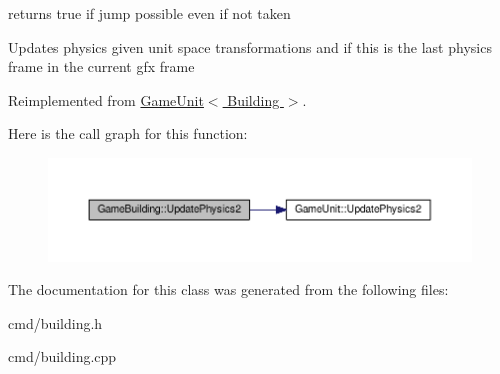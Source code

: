returns true if jump possible even if not taken 

Updates physics given unit space transformations and if this is the last physics frame in the current gfx frame 

Reimplemented from \hyperlink{classGameUnit_af229f9e649c3dcf2f7a94082e070cc2b}{Game\+Unit$<$ Building $>$}.



Here is the call graph for this function\+:
\nopagebreak
\begin{figure}[H]
\begin{center}
\leavevmode
\includegraphics[width=350pt]{d8/d4a/classGameBuilding_a41b1af4a3b09603e76b52cf7f7617482_cgraph}
\end{center}
\end{figure}




The documentation for this class was generated from the following files\+:\begin{DoxyCompactItemize}
\item 
cmd/building.\+h\item 
cmd/building.\+cpp\end{DoxyCompactItemize}
